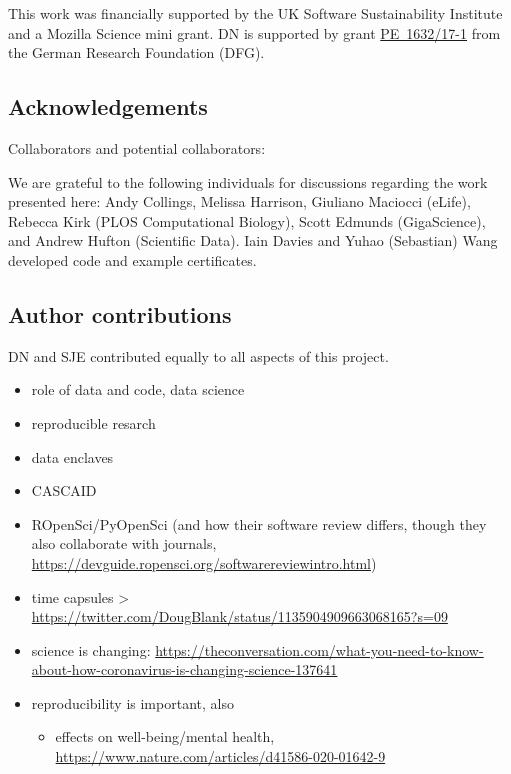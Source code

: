 \documentclass[12pt]{article}
\begin{document}
This work was financially supported by the UK Software
Sustainability Institute and a Mozilla Science mini grant.
DN is supported by grant \href{https://gepris.dfg.de/gepris/projekt/415851837}{PE~1632/17-1} from the German Research Foundation (DFG).

\subsection*{Acknowledgements}\label{acknowledgements}

Collaborators and potential collaborators:

We are grateful to the following individuals for discussions regarding
the work presented here: Andy Collings, Melissa Harrison, Giuliano
Maciocci (eLife), Rebecca Kirk (PLOS Computational Biology), Scott
Edmunds (GigaScience), and Andrew Hufton (Scientific Data). Iain Davies and
Yuhao (Sebastian) Wang developed code and example certificates.

\subsection*{Author contributions}

DN and SJE contributed equally to all aspects of this project.

{\small
}


\clearpage
\begin{itemize}
\item
  role of data and code, data science
\item
  reproducible resarch
\item
  data enclaves
\item
  CASCAID
\item
  ROpenSci/PyOpenSci (and how their software review differs, though they
  also collaborate with journals,
  \url{https://devguide.ropensci.org/softwarereviewintro.html})
\item
  time capsules \textgreater{}
  \url{https://twitter.com/DougBlank/status/1135904909663068165?s=09}
\item
  science is changing:
  \url{https://theconversation.com/what-you-need-to-know-about-how-coronavirus-is-changing-science-137641}
\item
  reproducibility is important, also

  \begin{itemize}
  \item
    effects on well-being/mental health,
    \url{https://www.nature.com/articles/d41586-020-01642-9}
  \end{itemize}
\end{itemize}
\end{document}
